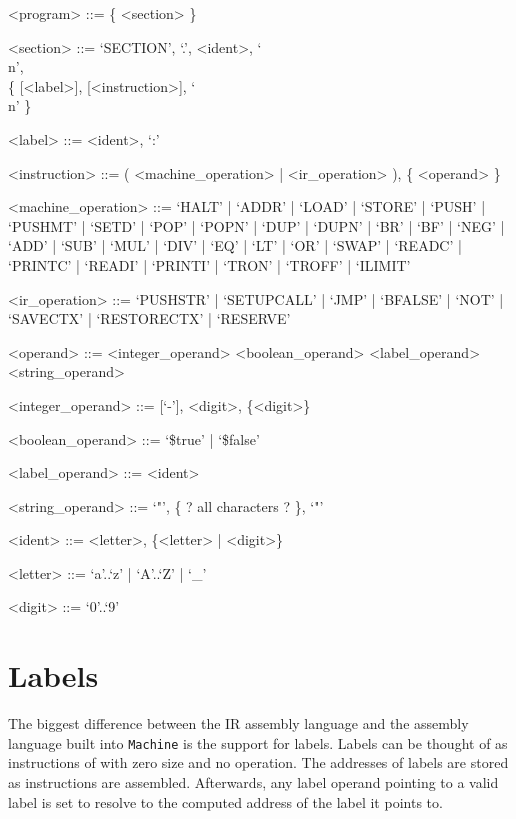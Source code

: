 \documentclass[oneside]{amsart}
\theoremstyle{definition}
\theoremstyle{remark}
\numberwithin{equation}{section}
\begin{document}
\setlength{\grammarindent}{12em}
\begin{grammar}
<program>           ::= \{ <section> \}

<section>           ::= `SECTION', `.', <ident>, `\\n', \\
                        \{ [<label>], [<instruction>], `\\n' \}

<label>             ::= <ident>, `:'

<instruction>       ::= ( <machine_operation> | <ir_operation> ), \{ <operand> \}

<machine_operation> ::= `HALT' | `ADDR' | `LOAD' | `STORE' | `PUSH' | `PUSHMT' | `SETD' | `POP' | `POPN' | `DUP' | `DUPN' | `BR' | `BF' | `NEG' | `ADD' | `SUB' | `MUL' | `DIV' | `EQ' | `LT' | `OR' | `SWAP' | `READC' | `PRINTC' | `READI' | `PRINTI' | `TRON' | `TROFF' | `ILIMIT'

<ir_operation>      ::= `PUSHSTR' | `SETUPCALL' | `JMP' | `BFALSE' | `NOT' | `SAVECTX' | `RESTORECTX' | `RESERVE'

<operand>           ::= <integer_operand>
\alt                    <boolean_operand>
\alt                    <label_operand>
\alt                    <string_operand>

<integer_operand>   ::= [`-'], <digit>, \{<digit>\}

<boolean_operand>   ::= `\$true' | `\$false'

<label_operand>     ::= <ident>

<string_operand>    ::= `"', \{ ? all characters ? \}, `"'

<ident>             ::= <letter>, \{<letter> | <digit>\}

<letter>            ::= `a'..`z' | `A'..`Z' | `_'

<digit>             ::= `0'..`9'
\end{grammar}

\section{Labels}
The biggest difference between the IR assembly language and the assembly language built into
\texttt{Machine} is the support for labels. Labels can be thought of as instructions of with zero
size and no operation. The addresses of labels are stored as instructions are assembled. Afterwards,
any label operand pointing to a valid label is set to resolve to the computed address of the label
it points to.
\end{document}
